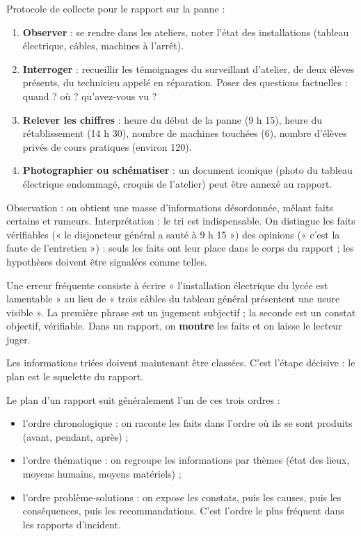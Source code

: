 \documentclass[11pt]{article}
\newcommand{\cle}[1]{{\popxbold\color{popdark}#1}}
\newcounter{popsec}
\newcounter{popsub}
\newcommand{\courssub}[1]{%
  \stepcounter{popsub}%
  \par\vspace{9pt}\noindent{\popxbold\fontsize{11.5}{13}\selectfont\color{popink}{\color{poporange}\thepopsec.\thepopsub}\hspace{6pt}#1}\par\nopagebreak\vspace{4pt}
}
\begin{document}
\begin{experience}
Protocole de collecte pour le rapport sur la panne :
\begin{enumerate}
\item \textbf{Observer} : se rendre dans les ateliers, noter l'état des installations (tableau électrique, câbles, machines à l'arrêt).
\item \textbf{Interroger} : recueillir les témoignages du surveillant d'atelier, de deux élèves présents, du technicien appelé en réparation. Poser des questions factuelles : quand ? où ? qu'avez-vous vu ?
\item \textbf{Relever les chiffres} : heure du début de la panne (9 h 15), heure du rétablissement (14 h 30), nombre de machines touchées (6), nombre d'élèves privés de cours pratiques (environ 120).
\item \textbf{Photographier ou schématiser} : un document iconique (photo du tableau électrique endommagé, croquis de l'atelier) peut être annexé au rapport.
\end{enumerate}
Observation : on obtient une masse d'informations désordonnée, mêlant faits certains et rumeurs.
Interprétation : le tri est indispensable. On distingue les \cle{faits} vérifiables (« le disjoncteur général a sauté à 9 h 15 ») des \cle{opinions} (« c'est la faute de l'entretien ») : seuls les faits ont leur place dans le corps du rapport ; les hypothèses doivent être signalées comme telles.
\end{experience}

\begin{attention}
Une erreur fréquente consiste à écrire « l'installation électrique du lycée est lamentable » au lieu de « trois câbles du tableau général présentent une usure visible ». La première phrase est un jugement subjectif ; la seconde est un constat objectif, vérifiable. Dans un rapport, on \textbf{montre} les faits et on laisse le lecteur juger.
\end{attention}

\courssub{Élaborer le plan : choisir un ordre}

Les informations triées doivent maintenant être \cle{classées}. C'est l'étape décisive : le plan est le squelette du rapport.

\begin{definition}
Le plan d'un rapport suit généralement l'un de ces trois ordres :
\begin{itemize}
\item l'ordre \cle{chronologique} : on raconte les faits dans l'ordre où ils se sont produits (avant, pendant, après) ;
\item l'ordre \cle{thématique} : on regroupe les informations par thèmes (état des lieux, moyens humains, moyens matériels) ;
\item l'ordre \cle{problème-solutions} : on expose les constats, puis les causes, puis les conséquences, puis les recommandations. C'est l'ordre le plus fréquent dans les rapports d'incident.
\end{itemize}
\end{definition}
\end{document}
